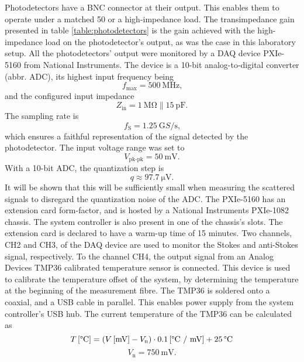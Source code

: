 \documentclass{standalone}
\begin{document}
Photodetectors have a BNC connector at their output. This enables them to operate under a matched 50 \textOmega or a high-impedance load. The transimpedance gain presented in table \ref{table:photodetectors} is the gain achieved with the high-impedance load on the photodetector's output, as was the case in this laboratory setup. All the photodetectors' output were monitored by a DAQ device PXIe-5160 from National Instruments. The device is a 10-bit analog-to-digital converter (abbr. ADC), its highest input frequency being
\begin{equation}
f_\textrm{max} = \SI{500}{\mega \hertz} \textrm{,}
\end{equation}
and the configured input impedance
\begin{equation}
Z_\textrm{in} = \SI{1}{\mega \ohm} \| \SI{15}{\pico \farad} \textrm{.}
\end{equation}
The sampling rate is
\begin{equation}
f_\textrm{S} = \SI{1.25}{\giga S / \second} \textrm{,}
\end{equation}
which ensures a faithful representation of the signal detected by the photodetector. The input voltage range was set to
\begin{equation}
V_\textrm{pk-pk} = \SI{50}{\milli \volt} \textrm{.}
\end{equation}
With a 10-bit ADC, the quantization step is
\begin{equation}
q \approx \SI{97.7}{\micro \volt} \textrm{.}
\end{equation}
It will be shown that this will be sufficiently small when measuring the scattered signals to disregard the quantization noise of the ADC. The PXIe-5160 has an extension card form-factor, and is hosted by a National Instruments PXIe-1082 chassis. The system controller is also present in one of the chassis's slots. The extension card is declared to have a warm-up time of 15 minutes. Two channels, CH2 and CH3, of the DAQ device are used to monitor the Stokes and anti-Stokes signal, respectively. To the channel CH4, the output signal from an Analog Devices TMP36 calibrated temperature sensor is connected. This device is used to calibrate the temperature offset of the system, by determining the temperature at the beginning of the measurement fibre. The TMP36 is soldered onto a coaxial, and a USB cable in parallel. This enables power supply from the system controller's USB hub. The current temperature of the TMP36 can be calculated as \cite{datasheet:tmp36}
\begin{equation}
T \, \textrm{[\textdegree C]} = \left( V \, \textrm{[mV]} - V_\textrm{n} \right) \cdot 0.1 \, \textrm{[\textdegree C / mV]} + 25 \, \textrm{\textdegree C}
\end{equation}
\begin{equation}
V_\textrm{n} = \SI{750}{\milli \volt} \textrm{.}
\end{equation}
\end{document}
